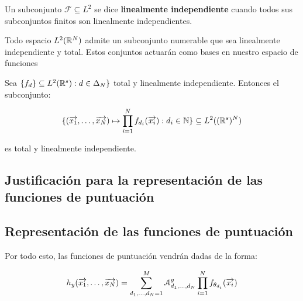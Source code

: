 \begin{definicion}

    Un subconjunto $\mathcal{F} \subseteq L^2$ se dice \textbf{linealmente independiente} cuando todos sus subconjuntos finitos son linealmente independientes.

\end{definicion}

\begin{proposicion}
    Todo espacio $L^2(\mathbb{R}^N)$ admite un subconjunto numerable que sea linealmente independiente y total. Estos conjuntos actuarán como bases en nuestro espacio de funciones
\end{proposicion}

\begin{proposicion}
    Sea $\{f_d\} \subseteq L^2(\mathbb{R}^s): d \in \Delta_{N} \}$ total y linealmente independiente. Entonces el subconjunto:

    \begin{equation}
        \{ (\overrightarrow{x_1}, \ldots, \overrightarrow{x_N}) \mapsto \prod_{i = 1}^N f_{d_i}(\overrightarrow{x_i}): d_i \in \mathbb{N} \} \subseteq L^2((\mathbb{R}^s)^N)
    \end{equation}

    es total y linealmente independiente.
\end{proposicion}

\subsection{Justificación para la representación de las funciones de puntuación} \label{sec:justificacion_func_repr}


\subsection{Representación de las funciones de puntuación} \label{sec:repr_funciones_puntuacion}

Por todo esto, las funciones de puntuación vendrán dadas de la forma:

\begin{equation} \label{eq:puntuacion_general}
    h_y(\overrightarrow{x_1}, \ldots, \overrightarrow{x_N}) = \sum_{d_1, \ldots, d_N = 1}^{M} \mathcal{A}^y_{d_1, \ldots, d_N} \prod_{i = 1}^N f_{\theta_{d_i}}(\overrightarrow{x_i})
\end{equation}


